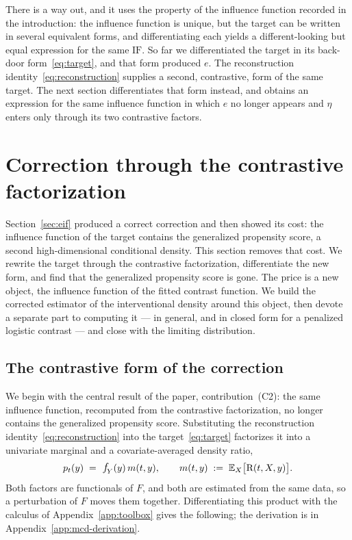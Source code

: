 \documentclass[11pt]{article}
\theoremstyle{plain}
\theoremstyle{definition}
\theoremstyle{remark}
\newcommand{\pE}{\ensuremath{\mathbb{E}}}
\newcommand{\pf}[1]{\ensuremath{\,\mathlarger{\textit{f}}_{#1}}}
\newcommand{\DensityRatio}{\text{R}}
\newcommand{\IF}{\mathrm{IF}}
\newcommand{\gps}{e}
\begin{document}
There is a way out, and it uses the property of the influence function recorded in the
introduction: the influence function is unique, but the target can be written in several
equivalent forms, and differentiating each yields a different-looking but equal expression for
the same $\IF$. So far we differentiated the target in its back-door form~\eqref{eq:target},
and that form produced $\gps$. The reconstruction identity~\eqref{eq:reconstruction} supplies
a second, contrastive, form of the same target. The next section differentiates that form
instead, and obtains an expression for the same influence function in which $\gps$ no longer
appears and $\eta$ enters only through its two contrastive factors.

\section{Correction through the contrastive factorization}
\label{sec:mcd-correction}

Section~\ref{sec:eif} produced a correct correction and then showed its cost: the influence
function of the target contains the generalized propensity score, a second high-dimensional
conditional density. This section removes that cost. We rewrite the target through the
contrastive factorization, differentiate the new form, and find that the generalized
propensity score is gone. The price is a new object, the influence function of the fitted contrast function. We build the
corrected estimator of the interventional density around this object, then devote a separate part
to computing it --- in general, and in closed form for a penalized logistic contrast --- and
close with the limiting distribution.

\subsection{The contrastive form of the correction}
\label{sec:mcd-form}

We begin with the central result of the paper, contribution~(C2): the same influence function,
recomputed from the contrastive factorization, no longer contains the generalized propensity
score. Substituting the reconstruction identity~\eqref{eq:reconstruction} into the
target~\eqref{eq:target} factorizes it into a univariate marginal and a covariate-averaged
density ratio,
\begin{equation}
p_t(y) \;=\; \pf{Y}(y)\,m(t,y),
\qquad
m(t,y) \;:=\; \pE_X\big[\DensityRatio(t,X,y)\big] .
\label{eq:factorization}
\end{equation}
Both factors are functionals of $F$, and both are estimated from the same data, so a
perturbation of $F$ moves them together. Differentiating this product with the calculus of
Appendix~\ref{app:toolbox} gives the following; the derivation is in
Appendix~\ref{app:mcd-derivation}.
\end{document}
